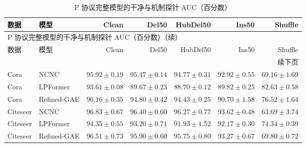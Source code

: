{\footnotesize
\setlength{\tabcolsep}{3.2pt}
\renewcommand{\arraystretch}{1.10}
\begin{longtable}{llrrrrr}
\caption{P 协议完整模型的干净与机制探针 AUC（百分数）}\\
\toprule
数据 & 模型 & Clean & Del50 & HubDel50 & Ins50 & Shuffle \\
\midrule
\endfirsthead
\multicolumn{7}{l}{P 协议完整模型的干净与机制探针 AUC（百分数）（续）}\\
\toprule
数据 & 模型 & Clean & Del50 & HubDel50 & Ins50 & Shuffle \\
\midrule
\endhead
\midrule\multicolumn{7}{r}{续下页}\\
\endfoot
\bottomrule
\endlastfoot
Cora & NCNC & $95.92\pm0.19$ & $95.47\pm0.14$ & $94.77\pm0.31$ & $92.92\pm0.55$ & $69.16\pm1.69$ \\
Cora & LPFormer & $93.61\pm0.08$ & $89.67\pm0.23$ & $88.70\pm0.12$ & $89.82\pm0.25$ & $82.63\pm0.58$ \\
Cora & Refined-GAE & $96.16\pm0.35$ & $94.80\pm0.42$ & $94.43\pm0.25$ & $90.70\pm1.58$ & $76.52\pm1.64$ \\
Citeseer & NCNC & $96.83\pm0.67$ & $96.40\pm0.60$ & $96.27\pm0.77$ & $93.62\pm0.48$ & $63.69\pm3.74$ \\
Citeseer & LPFormer & $94.35\pm0.55$ & $93.20\pm0.71$ & $91.93\pm1.52$ & $92.17\pm0.30$ & $74.34\pm0.39$ \\
Citeseer & Refined-GAE & $96.51\pm0.73$ & $95.90\pm0.60$ & $95.75\pm0.80$ & $93.27\pm0.67$ & $69.80\pm0.72$ \\
\end{longtable}
}
